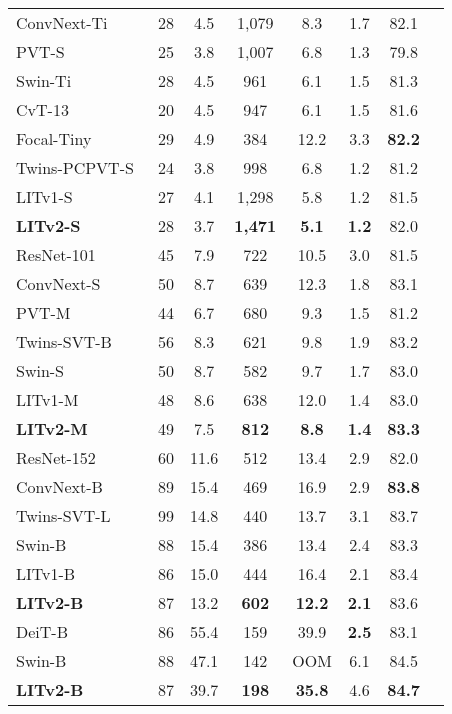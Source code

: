 \begin{table}[!htb]
{\begin{tabular}{l|ccccccc}
ConvNext-Ti~\cite{convnext}     & 28 & 4.5  & 1,079 & 8.3  & 1.7 & 82.1 \\
PVT-S~\cite{pvt}         & 25 & 3.8  & 1,007 & 6.8  & 1.3 & 79.8 \\
Swin-Ti~\cite{swin}       & 28 & 4.5  & 961  & 6.1  & 1.5 & 81.3 \\
CvT-13~\cite{cvt}        & 20 & 4.5  & 947  & 6.1  & 1.5 & 81.6 \\
Focal-Tiny~\cite{yang2021focal}    & 29 & 4.9  & 384  & 12.2 & 3.3 & \textbf{82.2} \\
Twins-PCPVT-S~\cite{chu2021Twins} & 24 & 3.8  & 998  & 6.8  & 1.2 & 81.2 \\
LITv1-S~\cite{lit}         & 27 & 4.1  & 1,298 & 5.8  & 1.2 & 81.5 \\
\textbf{LITv2-S}      & 28 & 3.7  & \textbf{1,471} & \textbf{5.1}  & \textbf{1.2} & \textcolor{mblue}{82.0} \\ \hline
ResNet-101~\cite{resnet_back}    & 45 & 7.9  & 722  & 10.5 & 3.0 & 81.5 \\
ConvNext-S~\cite{convnext}    & 50 & 8.7  & 639  & 12.3 & 1.8 & 83.1 \\
PVT-M~\cite{pvt}         & 44 & 6.7  & 680  & 9.3  & 1.5 & 81.2 \\
Twins-SVT-B~\cite{chu2021Twins}   & 56 & 8.3  & 621  & 9.8  & 1.9 & 83.2 \\
Swin-S~\cite{swin}        & 50 & 8.7  & 582  & 9.7  & 1.7 & 83.0 \\
LITv1-M~\cite{lit}         & 48 & 8.6  & 638  & 12.0 & 1.4 & 83.0 \\
\textbf{LITv2-M}      & 49 & 7.5  & \textbf{812}  & \textbf{8.8}  & \textbf{1.4} & \textbf{83.3} \\ \hline
ResNet-152~\cite{resnet_back}    & 60 & 11.6  & 512  & 13.4 & 2.9 & 82.0 \\
ConvNext-B~\cite{convnext}    & 89 & 15.4  & 469  & 16.9 & 2.9 & \textbf{83.8} \\
Twins-SVT-L~\cite{chu2021Twins}   & 99 & 14.8 & 440  & 13.7 & 3.1 & 83.7 \\
Swin-B~\cite{swin}        & 88 & 15.4 & 386  & 13.4 & 2.4 & 83.3 \\
LITv1-B~\cite{lit}         & 86 & 15.0 & 444  & 16.4 & 2.1 & 83.4 \\
\textbf{LITv2-B}      & 87 & 13.2 & \textbf{602}  & \textbf{12.2} & \textbf{2.1} & \textcolor{mblue}{83.6} \\ \hline
DeiT-B~\cite{deit}        & 86 & 55.4 & 159  & 39.9 & \textbf{2.5} & 83.1 \\
Swin-B~\cite{swin}        & 88 & 47.1 & 142  & OOM & 6.1 & 84.5 \\
\textbf{LITv2-B}      & 87 & 39.7 & \textbf{198}  & \textbf{35.8} & 4.6 & \textbf{84.7}
\end{tabular}
}
\vspace{-3mm}
\end{table}


